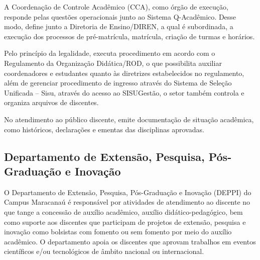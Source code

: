 \documentclass{paper}
\begin{document}
A Coordenação de Controle Acadêmico (CCA), como órgão de execução, responde pelas questões operacionais junto ao Sistema Q-Acadêmico. Desse modo, define junto a Diretoria de Ensino/DIREN, a qual é subordinada, a execução dos processos de pré-matrícula, matrícula, criação de turmas e horários.
 
Pelo princípio da legalidade, executa procedimento em acordo com o Regulamento da Organização Didática/ROD, o que possibilita auxiliar coordenadores e estudantes quanto às diretrizes estabelecidos no regulamento, além de gerenciar procedimento de ingresso através do Sistema de Seleção Unificada – Sisu, através do acesso ao SISUGestão, o setor também controla e organiza arquivos de discentes. 

No atendimento ao público discente, emite documentação de situação acadêmica, como históricos, declarações e ementas das disciplinas aprovadas.

\subsection{Departamento de Extensão, Pesquisa, Pós-Graduação e Inovação}


O Departamento de Extensão, Pesquisa, Pós-Graduação e Inovação (DEPPI) do  Campus Maracanaú é responsável por atividades de atendimento ao discente no que tange a concessão de auxílio acadêmico, auxílio didático-pedagógico, bem como suporte aos discentes que participam de projetos de extensão, pesquisa e inovação como bolsistas com fomento ou sem fomento por meio do auxílio acadêmico. O departamento apoia os discentes que aprovam trabalhos em eventos científicos e/ou tecnológicos de âmbito nacional ou internacional. 
\end{document}
